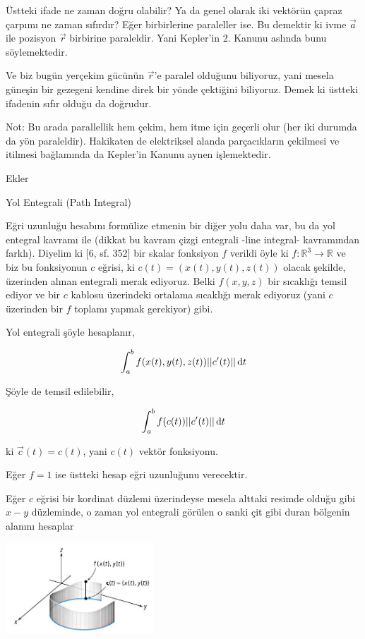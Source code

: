 \documentclass[12pt,fleqn]{article}\usepackage{../../common}
\begin{document}
Üstteki ifade ne zaman doğru olabilir? Ya da genel olarak iki vektörün çapraz
çarpımı ne zaman sıfırdır? Eğer birbirlerine paraleller ise. Bu demektir ki ivme
$\vec{a}$ ile pozisyon $\vec{r}$ birbirine paraleldir. Yani Kepler'in 2. Kanunu
aslında bunu söylemektedir.

Ve biz bugün yerçekim gücünün $\vec{r}$'e paralel olduğunu biliyoruz, yani
mesela güneşin bir gezegeni kendine direk bir yönde çektiğini biliyoruz. Demek
ki üstteki ifadenin sıfır olduğu da doğrudur.

Not: Bu arada parallellik hem çekim, hem itme için geçerli olur (her iki durumda
da yön paraleldir). Hakikaten de elektriksel alanda parçacıkların çekilmesi ve
itilmesi bağlamında da Kepler'in Kanunu aynen işlemektedir.

Ekler

Yol Entegrali (Path Integral)

Eğri uzunluğu hesabını formülize etmenin bir diğer yolu daha var, bu da yol
entegral kavramı ile (dikkat bu kavram çizgi entegrali -line integral-
kavramından farklı). Diyelim ki [6, sf. 352] bir skalar fonksiyon $f$ verildi
öyle ki $f: \mathbb{R}^3 \to \mathbb{R}$ ve biz bu fonksiyonun $c$ eğrisi, ki
$c(t) = (x(t),y(t),z(t))$ olacak şekilde, üzerinden alınan entegrali merak
ediyoruz. Belki $f(x,y,z)$ bir sıcaklığı temsil ediyor ve bir $c$ kablosu
üzerindeki ortalama sıcaklığı merak ediyoruz (yani $c$ üzerinden bir $f$ toplamı
yapmak gerekiyor) gibi.

Yol entegrali şöyle hesaplanır,

$$
\int _{a}^{b} f(x(t),y(t),z(t)) || c'(t) || \,\mathrm{d} t
$$

Şöyle de temsil edilebilir,

$$
\int_{a}^{b} f(c(t)) || c'(t) || \,\mathrm{d} t
$$

ki $\vec{c}(t) = c(t)$, yani $c(t)$ vektör fonksiyonu.

Eğer $f = 1$ ise üstteki hesap eğri uzunluğunu verecektir. 

Eğer $c$ eğrisi bir kordinat düzlemi üzerindeyse mesela alttaki resimde olduğu
gibi $x-y$ düzleminde, o zaman yol entegrali görülen o sanki çit gibi duran
bölgenin alanını hesaplar

\includegraphics[width=15em]{calc_multi_06_04.jpg}
\end{document}

